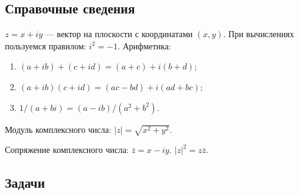 
\subsection*{Справочные сведения}

\noindent $z=x+iy$ --- вектор на плоскости с координатами $(x,y)$. При вычислениях пользуемся правилом: $i^2=-1$. Арифметика:
\begin{enumerate}
\item $(a+ib)+(c+id)=(a+c)+i(b+d)$;
\item $(a+ib)(c+id)=(ac-bd)+i(ad+bc)$;
\item $1/(a+bi) = (a-ib)/(a^2+b^2)$.
\end{enumerate}

\noindent Модуль комплексного числа: $|z|=\sqrt{x^2+y^2}$.

\noindent Сопряжение комплексного числа: $\bar z=x-iy$. $|z|^2=z\bar z$.


\subsection*{Задачи}

